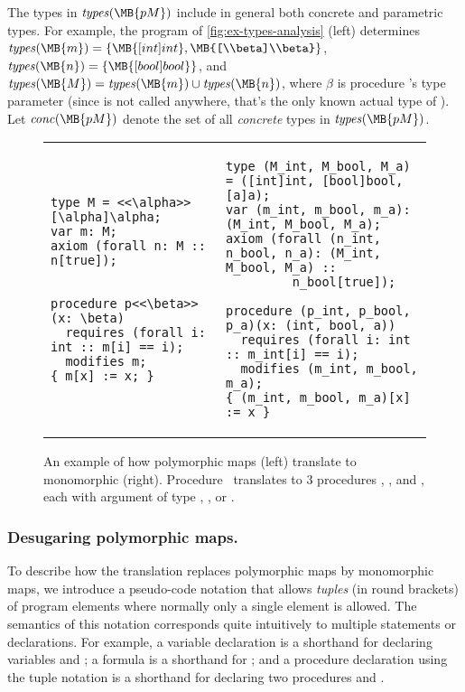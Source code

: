 \documentclass[a4paper,final]{llncs}
\newcommand{\typesOf}[1]{\mathit{types}(\MB{#1})}
\newcommand{\ctypesOf}[1]{\mathit{conc}(\MB{#1})}
\begin{document}
The types in $\typesOf{pM}$ include in general both concrete and parametric types.
For example, the program of \autoref{fig:ex-types-analysis} (left) determines $\typesOf{m} = \{ \MB{[int]int}, \MB{[\\beta]\\beta} \}$, \linebreak $\typesOf{n} = \{ \MB{[bool]bool} \}$, and $\typesOf{M} = \typesOf{m} \cup \typesOf{n}$, 
where $\beta$ is procedure 's type parameter (since  is not called anywhere, that's the only known actual type of ).
Let $\ctypesOf{pM}$ denote the set of all \emph{concrete} types in $\typesOf{pM}$.

\begin{figure}[!htb]
\lstset{xleftmargin=0mm}
\scriptsize
\begin{tabular}{p{} p{}}
{\begin{lstlisting}[language=boogie]
type M = <<\alpha>> [\alpha]\alpha;
var m: M;
axiom (forall n: M :: n[true]);


procedure p<<\beta>>(x: \beta)
  requires (forall i: int :: m[i] == i);
  modifies m;
{ m[x] := x; }\end{lstlisting}}
&
{\begin{lstlisting}[language=boogie]
type (M_int, M_bool, M_a) = ([int]int, [bool]bool, [a]a);
var (m_int, m_bool, m_a): (M_int, M_bool, M_a);
axiom (forall (n_int, n_bool, n_a): (M_int, M_bool, M_a) ::
         n_bool[true]);

procedure (p_int, p_bool, p_a)(x: (int, bool, a))
  requires (forall i: int :: m_int[i] == i);
  modifies (m_int, m_bool, m_a);
{ (m_int, m_bool, m_a)[x] := x }\end{lstlisting}}
\end{tabular}
\caption{An example of how polymorphic maps (left) translate to monomorphic (right).
Procedure~ translates to 3 procedures , , and , each with argument of type , , or .}
\label{fig:ex-types-analysis}
\end{figure}

\subsubsection{Desugaring polymorphic maps.}
To describe how the translation replaces polymorphic maps by monomorphic maps, we introduce a pseudo-code notation that allows \emph{tuples} (in round brackets) of program elements where normally only a single element is allowed.
The semantics of this notation corresponds quite intuitively to multiple statements or declarations.
For example, a variable declaration  is a shorthand for declaring variables  and ; a formula  is a shorthand for ; and a procedure declaration using the tuple notation  is a shorthand for declaring two procedures  and .
\end{document}
